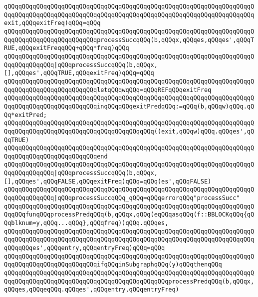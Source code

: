 \verb|qQQqqQQqqQQqqQQqqQQqqQQqqQQqqQQqqQQqqQQqqQQqqQQqqQQqqQQqqQQqqQQqqQQqqQQqqQQqqQQqqQQqqQQqqQQqqQQqqQQqqQQqqQQqqQQqqQQqqQQqqQQqqQQqqQQqqQQqqQQqexit,qQQqexitFreq)qQQq=qQQq|\newline
\verb|qQQqqQQqqQQqqQQqqQQqqQQqqQQqqQQqqQQqqQQqqQQqqQQqqQQqqQQqqQQqqQQqqQQqqQQqqQQqqQQqqQQqqQQqqQQqqQQqprocessSuccqQQq(b,qQQqx,qQQqes,qQQqes',qQQqTRUE,qQQqexitFreqqQQq+qQQq*freq)qQQq|\newline
\verb|qQQqqQQqqQQqqQQqqQQqqQQqqQQqqQQqqQQqqQQqqQQqqQQqqQQqqQQqqQQqqQQqqQQqqQQqqQQqqQQqqQQq|\verb#|qQQqprocessSuccqQQq(b,qQQqx,[],qQQqes',qQQqTRUE,qQQqexitFreq)qQQq=qQQq#\newline
\verb|qQQqqQQqqQQqqQQqqQQqqQQqqQQqqQQqqQQqqQQqqQQqqQQqqQQqqQQqqQQqqQQqqQQqqQQqqQQqqQQqqQQqqQQqqQQqqQQqletqQQqwqQQq=qQQqREFqQQqexitFreq|\newline
\verb|qQQqqQQqqQQqqQQqqQQqqQQqqQQqqQQqqQQqqQQqqQQqqQQqqQQqqQQqqQQqqQQqqQQqqQQqqQQqqQQqqQQqqQQqqQQqqQQqinqQQqqQQqexitPredqQQq:=qQQq(b,qQQqw)qQQq.qQQq*exitPred;|\newline
\verb|qQQqqQQqqQQqqQQqqQQqqQQqqQQqqQQqqQQqqQQqqQQqqQQqqQQqqQQqqQQqqQQqqQQqqQQqqQQqqQQqqQQqqQQqqQQqqQQqqQQqqQQqqQQqqQQq((exit,qQQqw)qQQq.qQQqes',qQQqTRUE)|\newline
\verb|qQQqqQQqqQQqqQQqqQQqqQQqqQQqqQQqqQQqqQQqqQQqqQQqqQQqqQQqqQQqqQQqqQQqqQQqqQQqqQQqqQQqqQQqqQQqqQQqend|\newline
\verb|qQQqqQQqqQQqqQQqqQQqqQQqqQQqqQQqqQQqqQQqqQQqqQQqqQQqqQQqqQQqqQQqqQQqqQQqqQQqqQQqqQQq|\verb#|qQQqprocessSuccqQQq(b,qQQqx,[],qQQqes',qQQqFALSE,qQQqexitFreq)qQQq=qQQq(es',qQQqFALSE)#\newline
\verb|qQQqqQQqqQQqqQQqqQQqqQQqqQQqqQQqqQQqqQQqqQQqqQQqqQQqqQQqqQQqqQQqqQQqqQQqqQQqqQQqqQQq|\verb#|qQQqprocessSuccqQQq_qQQq=qQQqerrorqQQq"processSucc"#\newline
\newline
\verb|qQQqqQQqqQQqqQQqqQQqqQQqqQQqqQQqqQQqqQQqqQQqqQQqqQQqqQQqqQQqqQQqqQQqqQQqqQQqfunqQQqprocessPredqQQq(b,qQQqx,qQQq(eqQQqasqQQq(f::BBLOCKqQQq{qQQqblknum=y,qQQq...qQQq},qQQqfreq))qQQq.qQQqes,|\newline
\verb|qQQqqQQqqQQqqQQqqQQqqQQqqQQqqQQqqQQqqQQqqQQqqQQqqQQqqQQqqQQqqQQqqQQqqQQqqQQqqQQqqQQqqQQqqQQqqQQqqQQqqQQqqQQqqQQqqQQqqQQqqQQqqQQqqQQqqQQqqQQqqQQqqQQqes',qQQqentry,qQQqentryFreq)qQQq=qQQq|\newline
\verb|qQQqqQQqqQQqqQQqqQQqqQQqqQQqqQQqqQQqqQQqqQQqqQQqqQQqqQQqqQQqqQQqqQQqqQQqqQQqqQQqqQQqqQQqqQQqqQQqifqQQqinSubgraphqQQq(y)qQQqthenqQQq|\newline
\verb|qQQqqQQqqQQqqQQqqQQqqQQqqQQqqQQqqQQqqQQqqQQqqQQqqQQqqQQqqQQqqQQqqQQqqQQqqQQqqQQqqQQqqQQqqQQqqQQqqQQqqQQqqQQqqQQqqQQqprocessPredqQQq(b,qQQqx,qQQqes,qQQqeqQQq.qQQqes',qQQqentry,qQQqentryFreq)|\newline
